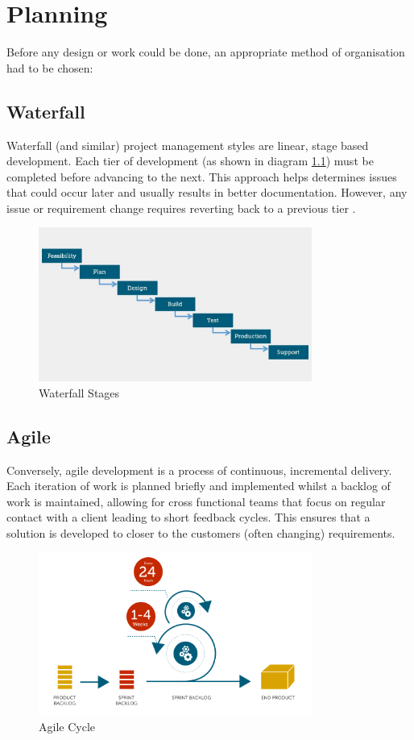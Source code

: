 \chapter{Planning}
Before any design or work could be done, an appropriate method of organisation had to be chosen:

\section{Waterfall}
Waterfall (and similar) project management styles are linear, stage based development. Each tier of development (as shown in diagram \ref{fig:waterfall}) must be completed before advancing to the next. This approach helps determines issues that could occur later and usually results in better documentation. However, any issue or requirement change requires reverting back to a previous tier \citep{agilevswaterfall}.

\begin{figure}[H]
    \centering
    \includegraphics[width=0.8\textwidth]{figs/3/waterfall}
    \caption{Waterfall Stages \citep{agilevswaterfall}}
    \label{fig:waterfall}
\end{figure}

\section{Agile}
Conversely, agile development is a process of continuous, incremental delivery. Each iteration of work is planned briefly and implemented whilst a backlog of work is maintained, allowing for cross functional teams that focus on regular contact with a client leading to short feedback cycles. This ensures that a solution is developed to closer to the customers (often changing) requirements.

\begin{figure}[H]
    \centering
    \includegraphics[width=0.8\textwidth]{figs/3/agile}
    \caption{Agile Cycle \citep{agilevswaterfall}}
    \label{fig:agile}
\end{figure}


